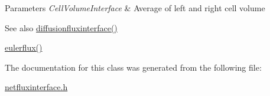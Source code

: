 \begin{DoxyParams}{Parameters}
{\em Cell\+Volume\+Interface} & Average of left and right cell volume\\
\hline
\end{DoxyParams}
\begin{DoxySeeAlso}{See also}
\hyperlink{classdiffusionfluxinterface}{diffusionfluxinterface()} 

\hyperlink{classeulerflux}{eulerflux()}
\end{DoxySeeAlso}


The documentation for this class was generated from the following file\+:\begin{DoxyCompactItemize}
\item 
\hyperlink{netfluxinterface_8h}{netfluxinterface.\+h}\end{DoxyCompactItemize}
